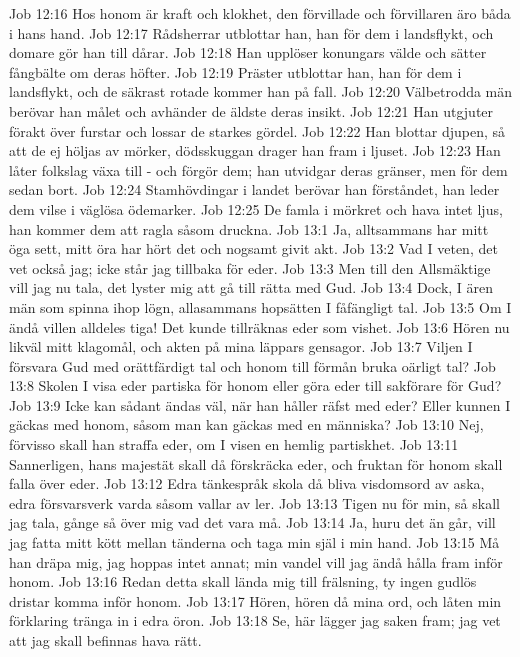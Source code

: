 Job 12:16  Hos honom är kraft och klokhet, den förvillade och förvillaren äro båda i hans hand.
Job 12:17  Rådsherrar utblottar han, han för dem i landsflykt, och domare gör han till dårar.
Job 12:18  Han upplöser konungars välde och sätter fångbälte om deras höfter.
Job 12:19  Präster utblottar han, han för dem i landsflykt, och de säkrast rotade kommer han på fall.
Job 12:20  Välbetrodda män berövar han målet och avhänder de äldste deras insikt.
Job 12:21  Han utgjuter förakt över furstar och lossar de starkes gördel.
Job 12:22  Han blottar djupen, så att de ej höljas av mörker, dödsskuggan drager han fram i ljuset.
Job 12:23  Han låter folkslag växa till - och förgör dem; han utvidgar deras gränser, men för dem sedan bort.
Job 12:24  Stamhövdingar i landet berövar han förståndet, han leder dem vilse i väglösa ödemarker.
Job 12:25  De famla i mörkret och hava intet ljus, han kommer dem att ragla såsom druckna.
Job 13:1  Ja, alltsammans har mitt öga sett, mitt öra har hört det och nogsamt givit akt.
Job 13:2  Vad I veten, det vet också jag; icke står jag tillbaka för eder.
Job 13:3  Men till den Allsmäktige vill jag nu tala, det lyster mig att gå till rätta med Gud.
Job 13:4  Dock, I ären män som spinna ihop lögn, allasammans hopsätten I fåfängligt tal.
Job 13:5  Om I ändå villen alldeles tiga! Det kunde tillräknas eder som vishet.
Job 13:6  Hören nu likväl mitt klagomål, och akten på mina läppars gensagor.
Job 13:7  Viljen I försvara Gud med orättfärdigt tal och honom till förmån bruka oärligt tal?
Job 13:8  Skolen I visa eder partiska för honom eller göra eder till sakförare för Gud?
Job 13:9  Icke kan sådant ändas väl, när han håller räfst med eder? Eller kunnen I gäckas med honom, såsom man kan gäckas med en människa?
Job 13:10  Nej, förvisso skall han straffa eder, om I visen en hemlig partiskhet.
Job 13:11  Sannerligen, hans majestät skall då förskräcka eder, och fruktan för honom skall falla över eder.
Job 13:12  Edra tänkespråk skola då bliva visdomsord av aska, edra försvarsverk varda såsom vallar av ler.
Job 13:13  Tigen nu för min, så skall jag tala, gånge så över mig vad det vara må.
Job 13:14  Ja, huru det än går, vill jag fatta mitt kött mellan tänderna och taga min själ i min hand.
Job 13:15  Må han dräpa mig, jag hoppas intet annat; min vandel vill jag ändå hålla fram inför honom.
Job 13:16  Redan detta skall lända mig till frälsning, ty ingen gudlös dristar komma inför honom.
Job 13:17  Hören, hören då mina ord, och låten min förklaring tränga in i edra öron.
Job 13:18  Se, här lägger jag saken fram; jag vet att jag skall befinnas hava rätt.
